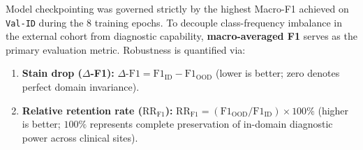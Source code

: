 \documentclass[11pt,a4paper]{article}
\begin{document}
Model checkpointing was governed strictly by the highest Macro-F1 achieved on
\texttt{Val-ID} during the 8 training epochs. To decouple class-frequency imbalance in
the external cohort from diagnostic capability, \textbf{macro-averaged F1} serves as
the primary evaluation metric. Robustness is quantified via:
\begin{enumerate}
  \item \textbf{Stain drop ($\Delta$-F1):}
        $\Delta\text{-F1} = \text{F1}_{\text{ID}} - \text{F1}_{\text{OOD}}$
        (lower is better; zero denotes perfect domain invariance).
  \item \textbf{Relative retention rate ($\text{RR}_{\text{F1}}$):}
        $\text{RR}_{\text{F1}} = (\text{F1}_{\text{OOD}} / \text{F1}_{\text{ID}})
        \times 100\%$ (higher is better; $100\%$ represents complete preservation of
        in-domain diagnostic power across clinical sites).
\end{enumerate}
\end{document}
